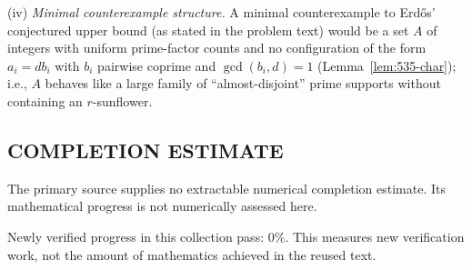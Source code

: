 (iv) \emph{Minimal counterexample structure.} A minimal counterexample to Erd\H{o}s' conjectured upper bound (as stated in the problem text) would be a set $A$ of integers with uniform prime-factor counts and no configuration of the form $a_i=db_i$ with $b_i$ pairwise coprime and $\gcd(b_i,d)=1$ (Lemma~\ref{lem:535-char}); i.e., $A$ behaves like a large family of ``almost-disjoint'' prime supports without containing an $r$-sunflower.


\subsection*{COMPLETION ESTIMATE}
The primary source supplies no extractable numerical completion estimate. Its mathematical progress is not numerically assessed here.

Newly verified progress in this collection pass: $0\%$. This measures new verification work, not the amount of mathematics achieved in the reused text.
